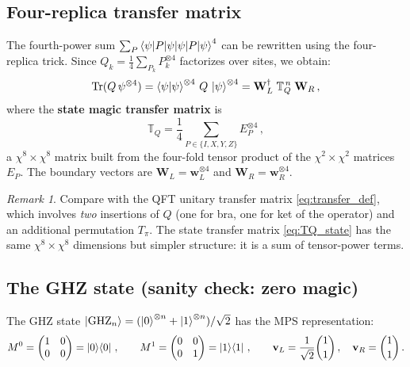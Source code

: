 \documentclass[11pt,a4paper]{article}
\theoremstyle{definition}
\theoremstyle{remark}
\newtheorem{remark}[theorem]{Remark}
\renewcommand{\Tr}{\mathrm{Tr}}
\begin{document}
\subsection{Four-replica transfer matrix}

The fourth-power sum $\sum_P \braket{\psi|P|\psi}^4$ can be rewritten using the four-replica trick.
Since $Q_k = \frac{1}{4}\sum_{P_k} P_k^{\otimes 4}$ factorizes over sites, we obtain:
\begin{equation}\label{eq:T_state}
  \Tr(Q\,\psi^{\otimes 4}) = \braket{\psi}^{\otimes 4}\,Q\,\ket{\psi}^{\otimes 4}
  = \mathbf{W}_L^\dagger\;\mathbb{T}_Q^{\,n}\;\mathbf{W}_R\,,
\end{equation}
where the \textbf{state magic transfer matrix} is
\begin{equation}\label{eq:TQ_state}
  \boxed{
  \mathbb{T}_Q = \frac{1}{4}\sum_{P\in\{I,X,Y,Z\}} E_P^{\otimes 4}\,,
  }
\end{equation}
a $\chi^8\times\chi^8$ matrix built from the four-fold tensor product of the $\chi^2\times\chi^2$ matrices $E_P$.
The boundary vectors are $\mathbf{W}_L = \mathbf{w}_L^{\otimes 4}$ and $\mathbf{W}_R = \mathbf{w}_R^{\otimes 4}$.

\begin{remark}
Compare with the QFT unitary transfer matrix \eqref{eq:transfer_def}, which involves \emph{two} insertions of $Q$ (one for bra, one for ket of the operator) and an additional permutation $T_\pi$.
The state transfer matrix \eqref{eq:TQ_state} has the same $\chi^8\times\chi^8$ dimensions but simpler structure: it is a sum of tensor-power terms.
\end{remark}

\subsection{The GHZ state (sanity check: zero magic)}

The GHZ state $\ket{\mathrm{GHZ}_n} = (\ket{0}^{\otimes n}+\ket{1}^{\otimes n})/\sqrt{2}$ has the MPS representation:
\begin{equation}
  M^0 = \begin{pmatrix} 1 & 0\\0 & 0\end{pmatrix} = \ket{0}\!\bra{0}\,,\qquad
  M^1 = \begin{pmatrix} 0 & 0\\0 & 1\end{pmatrix} = \ket{1}\!\bra{1}\,,\qquad
  \mathbf{v}_L = \frac{1}{\sqrt{2}}\binom{1}{1}\,,\quad
  \mathbf{v}_R = \binom{1}{1}\,.
\end{equation}
\end{document}
